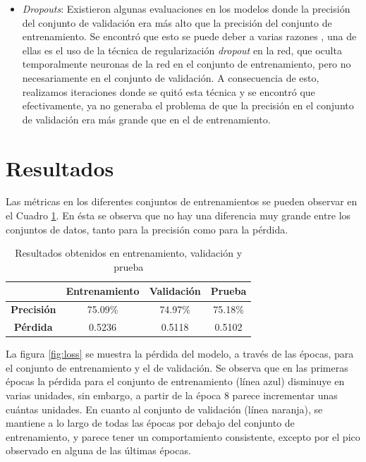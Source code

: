 \documentclass[sigconf, nonacm, spanish]{acmart}
\begin{document}
\begin{itemize}
\item\textit{Dropouts}: Existieron algunas evaluaciones en los modelos donde la precisión del conjunto de validación era más alto que la precisión del conjunto de entrenamiento. Se encontró que esto se puede deber a varias razones \cite{notas_clase,sanity,over_fittin}, una de ellas es el uso de la técnica de regularización \textit{dropout} en la red, que oculta temporalmente neuronas de la red en el conjunto de entrenamiento, pero no necesariamente en el conjunto de validación. A consecuencia de esto, realizamos iteraciones donde se quitó esta técnica y se encontró que efectivamente, ya no generaba el problema de que la precisión en el conjunto de validación era más grande que en el de entrenamiento. 

\end{itemize}

\section{Resultados}

Las métricas en los diferentes conjuntos de entrenamientos se pueden observar en el Cuadro \ref{tab:resultados}. En ésta se observa que no hay una diferencia muy grande entre los conjuntos de datos, tanto para la precisión como para la pérdida. 

\begin{table}[ht]
  \caption{Resultados obtenidos en entrenamiento, validación y prueba}
  \begin{tabular}{|c|c|c|c|}
    \toprule
      & \textbf{Entrenamiento} & \textbf{Validación} & \textbf{Prueba} \\
    \midrule
    
    \textbf{Precisión} & 75.09\% & 74.97\% & 75.18\% \\
    \hline
    \textbf{Pérdida} & 0.5236 & 0.5118 & 0.5102 \\
    \bottomrule
  \end{tabular}

 \label{tab:resultados}
\end{table}


La figura \ref{fig:loss} se muestra la pérdida del modelo, a través de las épocas, para el conjunto de entrenamiento y el de validación. Se observa que en las primeras épocas la pérdida para el conjunto de entrenamiento (línea azul) disminuye en varias unidades, sin embargo, a partir de la época 8 parece incrementar unas cuántas unidades. En cuanto al conjunto de validación (línea naranja), se mantiene a lo largo de todas las épocas por debajo del conjunto de entrenamiento, y parece tener un comportamiento consistente, excepto por el pico observado en alguna de las últimas épocas.
\end{document}

